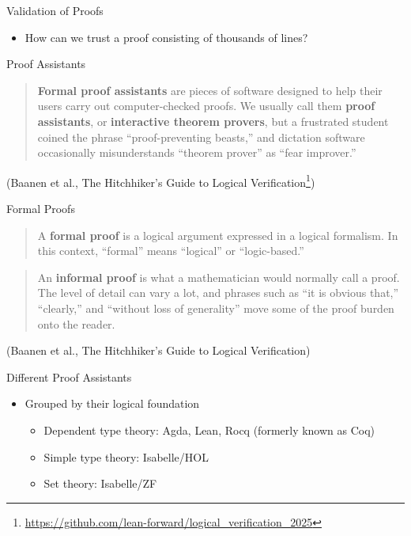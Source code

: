 \documentclass{beamer}
\begin{document}
\begin{frame}{Validation of Proofs}
  \begin{itemize}
    \item How can we trust a proof consisting of thousands of lines?
  \end{itemize}
\end{frame}

\begin{frame}{Proof Assistants}
  \begin{quote}
    \textbf{Formal proof assistants} are pieces of software designed to help their
    users carry out computer-checked proofs. We usually call them \textbf{proof
    assistants}, or \textbf{interactive theorem provers}, but a frustrated student
    coined the phrase ``proof-preventing beasts,'' and dictation software
    occasionally misunderstands ``theorem prover'' as ``fear improver.''
  \end{quote}

  (Baanen et al., The Hitchhiker's Guide to Logical Verification\footnote{\url{https://github.com/lean-forward/logical_verification_2025}})
\end{frame}

\begin{frame}{Formal Proofs}
  \begin{quote}
    A \textbf{formal proof} is a logical argument expressed in a logical formalism.
    In this context, ``formal'' means ``logical'' or ``logic-based.''
  \end{quote}

  \begin{quote}
    An \textbf{informal proof} is what a mathematician would normally call a proof.
    The level of detail can vary a lot, and phrases such as ``it is obvious
    that,'' ``clearly,'' and ``without loss of generality'' move some of the
    proof burden onto the reader.
  \end{quote}

  (Baanen et al., The Hitchhiker's Guide to Logical Verification)
\end{frame}

\begin{frame}{Different Proof Assistants}
  \begin{itemize}
    \item Grouped by their logical foundation
      \begin{itemize}
        \item Dependent type theory: Agda, Lean, Rocq (formerly known as Coq)
        \item Simple type theory: Isabelle/HOL
        \item Set theory: Isabelle/ZF
      \end{itemize}
  \end{itemize}
\end{frame}
\end{document}
